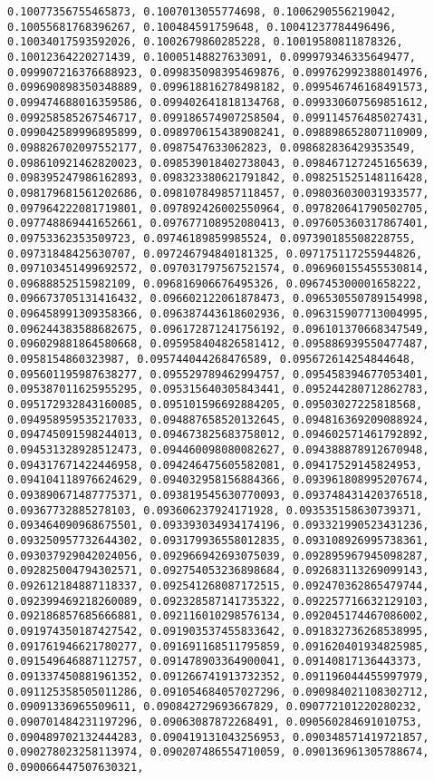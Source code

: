 \documentclass[11pt]{article}
\begin{document}
\begin{Verbatim}[commandchars=\\\{\}]
0.10077356755465873, 0.1007013055774698, 0.1006290556219042, 0.10055681768396267, 0.100484591759648, 0.10041237784496496, 0.10034017593592026, 0.1002679860285228, 0.10019580811878326, 0.10012364220271439, 0.10005148827633091, 0.099979346335649477, 0.099907216376688923, 0.099835098395469876, 0.099762992388014976, 0.099690898350348889, 0.099618816278498182, 0.099546746168491573, 0.099474688016359586, 0.099402641818134768, 0.099330607569851612, 0.099258585267546717, 0.099186574907258504, 0.099114576485027431, 0.099042589996895899, 0.098970615438908241, 0.098898652807110909, 0.098826702097552177, 0.0987547633062823, 0.098682836429353549, 0.098610921462820023, 0.098539018402738043, 0.098467127245165639, 0.098395247986162893, 0.098323380621791842, 0.098251525148116428, 0.098179681561202686, 0.098107849857118457, 0.098036030031933577, 0.097964222081719801, 0.097892426002550964, 0.097820641790502705, 0.097748869441652661, 0.097677108952080413, 0.097605360317867401, 0.09753362353509723, 0.09746189859985524, 0.097390185508228755, 0.09731848425630707, 0.097246794840181325, 0.097175117255944826, 0.097103451499692572, 0.097031797567521574, 0.096960155455530814, 0.09688852515982109, 0.096816906676495326, 0.096745300001658222, 0.096673705131416432, 0.096602122061878473, 0.096530550789154998, 0.096458991309358366, 0.096387443618602936, 0.096315907713004995, 0.096244383588682675, 0.096172871241756192, 0.096101370668347549, 0.096029881864580668, 0.095958404826581412, 0.095886939550477487, 0.0958154860323987, 0.095744044268476589, 0.095672614254844648, 0.095601195987638277, 0.095529789462994757, 0.095458394677053401, 0.095387011625955295, 0.095315640305843441, 0.095244280712862783, 0.095172932843160085, 0.095101596692884205, 0.09503027225818568, 0.094958959535217033, 0.094887658520132645, 0.094816369209088924, 0.094745091598244013, 0.094673825683758012, 0.094602571461792892, 0.094531328928512473, 0.094460098080082627, 0.094388878912670948, 0.094317671422446958, 0.094246475605582081, 0.09417529145824953, 0.094104118976624629, 0.094032958156884366, 0.093961808995207674, 0.093890671487775371, 0.093819545630770093, 0.093748431420376518, 0.09367732885278103, 0.093606237924171928, 0.093535158630739371, 0.093464090968675501, 0.093393034934174196, 0.093321990523431236, 0.093250957732644302, 0.093179936558012835, 0.093108926995738361, 0.093037929042024056, 0.092966942693075039, 0.092895967945098287, 0.092825004794302571, 0.092754053236898684, 0.092683113269099143, 0.092612184887118337, 0.092541268087172515, 0.092470362865479744, 0.092399469218260089, 0.092328587141735322, 0.092257716632129103, 0.092186857685666881, 0.092116010298576134, 0.092045174467086002, 0.091974350187427542, 0.091903537455833642, 0.091832736268538995, 0.091761946621780277, 0.091691168511795859, 0.091620401934825985, 0.091549646887112757, 0.091478903364900041, 0.09140817136443373, 0.091337450881961352, 0.091266741913732352, 0.091196044455997979, 0.091125358505011286, 0.091054684057027296, 0.090984021108302712, 0.09091336965509611, 0.090842729693667829, 0.090772101220280232, 0.090701484231197296, 0.09063087872268491, 0.090560284691010753, 0.090489702132444283, 0.090419131043256953, 0.090348571419721857, 0.090278023258113974, 0.090207486554710059, 0.090136961305788674, 0.090066447507630321, 
\end{Verbatim}
\end{document}
